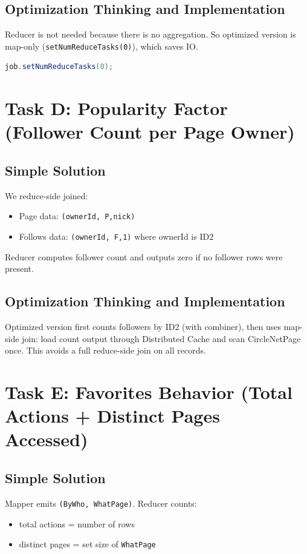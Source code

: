 \documentclass[11pt]{article}
\begin{document}
    \subsection*{Optimization Thinking and Implementation}
    Reducer is not needed because there is no aggregation.
    So optimized version is map-only (\texttt{setNumReduceTasks(0)}), which saves IO.

    \begin{lstlisting}[style=code,language=Java]
job.setNumReduceTasks(0);
    \end{lstlisting}

    \section{Task D: Popularity Factor (Follower Count per Page Owner)}
    \subsection*{Simple Solution}
    We reduce-side joined:
    \begin{itemize}
        \item Page data: \texttt{(ownerId, P,nick)}
        \item Follows data: \texttt{(ownerId, F,1)} where ownerId is ID2
    \end{itemize}
    Reducer computes follower count and outputs zero if no follower rows were present.

    \subsection*{Optimization Thinking and Implementation}
    Optimized version first counts followers by ID2 (with combiner), then uses map-side join:
    load count output through Distributed Cache and scan CircleNetPage once.
    This avoids a full reduce-side join on all records.

    \section{Task E: Favorites Behavior (Total Actions + Distinct Pages Accessed)}
    \subsection*{Simple Solution}
    Mapper emits \texttt{(ByWho, WhatPage)}.
    Reducer counts:
    \begin{itemize}
        \item total actions = number of rows
        \item distinct pages = set size of \texttt{WhatPage}
    \end{itemize}
\end{document}

